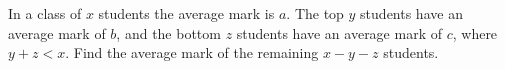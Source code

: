 In a class of $x$ students the average mark is $a$. The top $y$ students have an average mark of $b$, and the bottom $z$ students have an average mark of $c$, where $y+z<x$. Find the average mark of the remaining $x-y-z$ students.
